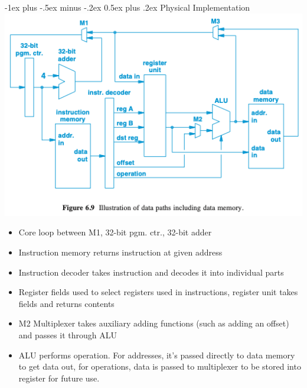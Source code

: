 \documentclass[letterpaper, 8pt]{extarticle}
\makeatletter
\renewcommand{\section}{\@startsection{section}{1}{0mm}%
                                {-1ex plus -.5ex minus -.2ex}%
                                {0.5ex plus .2ex}%
                                {\normalfont\normalsize\bfseries}}
\makeatother
\begin{document}
\begin{multicols*}{4}
	\section{Physical Implementation}
	\includegraphics[width=\linewidth]{data-paths.png}
	\begin{itemize}
		\item Core loop between M1, 32-bit pgm. ctr., 32-bit adder
		\item Instruction memory returns instruction at given address
		\item Instruction decoder takes instruction and decodes it into individual parts
		\item Register fields used to select registers used in instructions, register unit takes fields and returns contents
		\item M2 Multiplexer takes auxiliary adding functions (such as adding an offset) and passes it through ALU
		\item ALU performs operation. For addresses, it's passed directly to data memory to get data out,
		      for operations, data is passed to multiplexer to be stored into register for future use.
	\end{itemize}

\end{multicols*}
\end{document}
